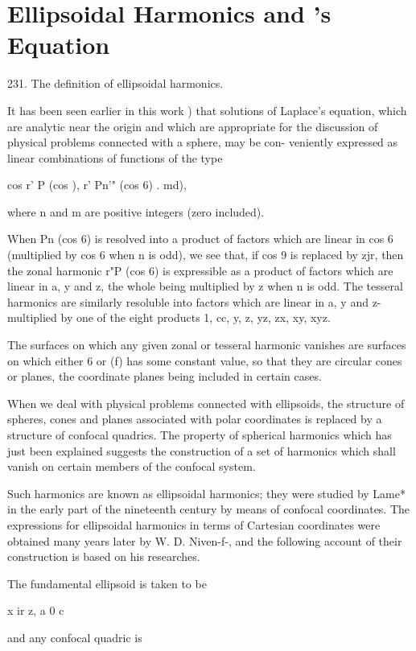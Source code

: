 \chapter{Ellipsoidal Harmonics and \Lame's Equation}

231. The definition of ellipsoidal harmonics.

It has been seen earlier in this work ) that solutions of
Laplace's equation, which are analytic near the origin and which are
appropriate for the discussion of physical problems connected with a
sphere, may be con- veniently expressed as linear combinations of
functions of the type

cos r' P (cos ), r' Pn'" (cos 6) . md),

where n and m are positive integers (zero included).

When Pn (cos 6) is resolved into a product of factors which are linear
in cos 6 (multiplied by cos 6 when n is odd), we see that, if cos 9 is
replaced by zjr, then the zonal harmonic r"P (cos 6) is expressible as
a product of factors which are linear in a, y and z, the whole being
multiplied by z when n is odd. The tesseral harmonics are similarly
resoluble into factors which are linear in a, y and z- multiplied by
one of the eight products 1, cc, y, z, yz, zx, xy, xyz.

The surfaces on which any given zonal or tesseral harmonic vanishes
are surfaces on which either 6 or (f) has some constant value, so that
they are circular cones or planes, the coordinate planes being
included in certain cases.

When we deal with physical problems connected with ellipsoids, the
structure of spheres, cones and planes associated with polar
coordinates is replaced by a structure of confocal quadrics. The
property of spherical harmonics which has just been explained suggests
the construction of a set of harmonics which shall vanish on certain
members of the confocal system.

Such harmonics are known as ellipsoidal harmonics; they were studied
by Lame* in the early part of the nineteenth century by means of
confocal coordinates. The expressions for ellipsoidal harmonics in
terms of Cartesian coordinates were obtained many years later by W. D.
Niven-f-, and the following account of their construction is based on
his researches.

The fundamental ellipsoid is taken to be

x ir z, a 0 c

and any confocal quadric is

